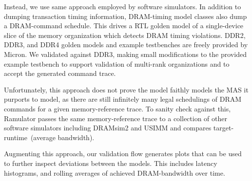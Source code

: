 Instead, we use same approach employed by software simulators. In
addition to dumping transaction timing information, DRAM-timing model classes
also dump a DRAM-command schedule. This drives a RTL golden model of a
single-device slice of the memory organization which detects DRAM timing
violations. DDR2, DDR3, and DDR4 golden models and example testbenches are
freely provided by Micron\cite{microngolden}. We validated against DDR3, making small
modifications to the provided example testbench to support validation of
multi-rank organizations and to accept the generated command trace.

Unfortunately, this approach does not prove the model faithly models the MAS it
purports to model, as there are still infinitely many legal schedulings of DRAM
commands for a given memory-reference trace. To sanity check against this,
Ramulator passes the same memory-reference trace to a collection of other
software simulators including DRAMsim2 and USIMM and compares
target-runtime~(average bandwidth).

Augmenting this approach, our validation flow generates plots that can be used
to further inspect deviations between the models. This includes latency
histograms, and rolling averages of achieved DRAM-bandwidth over time.
